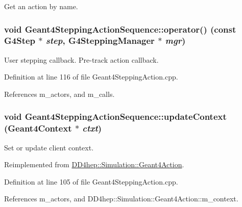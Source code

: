 Get an action by name. \hypertarget{class_d_d4hep_1_1_simulation_1_1_geant4_stepping_action_sequence_a51e1c2c59da560ac9bc6fc0d249e06dc}{
\subsubsection[{operator()}]{\setlength{\rightskip}{0pt plus 5cm}void Geant4SteppingActionSequence::operator() (const G4Step $\ast$ {\em step}, \/  G4SteppingManager $\ast$ {\em mgr})}}
\label{class_d_d4hep_1_1_simulation_1_1_geant4_stepping_action_sequence_a51e1c2c59da560ac9bc6fc0d249e06dc}


User stepping callback. Pre-\/track action callback. 

Definition at line 116 of file Geant4SteppingAction.cpp.

References m\_\-actors, and m\_\-calls.\hypertarget{class_d_d4hep_1_1_simulation_1_1_geant4_stepping_action_sequence_aababd8e6f650101a6ade162f82a29f61}{
\subsubsection[{updateContext}]{\setlength{\rightskip}{0pt plus 5cm}void Geant4SteppingActionSequence::updateContext ({\bf Geant4Context} $\ast$ {\em ctxt})}}
\label{class_d_d4hep_1_1_simulation_1_1_geant4_stepping_action_sequence_aababd8e6f650101a6ade162f82a29f61}


Set or update client context. 

Reimplemented from \hyperlink{class_d_d4hep_1_1_simulation_1_1_geant4_action_ae3b9daf2af881df956c46568c0743313}{DD4hep::Simulation::Geant4Action}.

Definition at line 105 of file Geant4SteppingAction.cpp.

References m\_\-actors, and DD4hep::Simulation::Geant4Action::m\_\-context.

